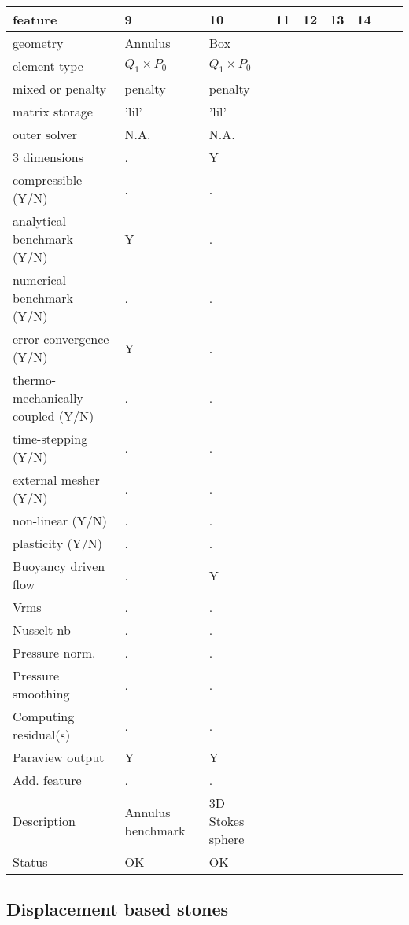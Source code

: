 \begin{landscape}
\noindent
{\tiny
\begin{tabular}{|l|p{2cm}|p{2cm}|p{2cm}|p{2cm}|p{2cm}|p{2cm}|p{2cm}|p{2cm}|} 
\hline
feature & 9 & 10 & 11 & 12 & 13 & 14 & \\ 
\hline
geometry & Annulus  & Box\\ 
element type & $Q_1\times P_0$ & $Q_1\times P_0$ & \\ 
mixed or penalty  & penalty & penalty & \\ 
matrix storage & 'lil' & 'lil' \\ 
outer solver & N.A. & N.A. \\ 
\hline
3 dimensions & . & Y & \\ 
compressible (Y/N)  & . & . &\\
analytical benchmark (Y/N) & Y & . &  \\ 
numerical benchmark (Y/N) & . & . & \\ 
error convergence (Y/N) & Y & . & \\
thermo-mechanically coupled (Y/N) & . & . &\\
time-stepping (Y/N) & . & . &\\
external mesher (Y/N) & .& . & \\
non-linear (Y/N) & .& . &\\
plasticity (Y/N) & . & .& \\ 
Buoyancy driven flow & .& Y & \\ 
Vrms  & . & . & \\ 
Nusselt nb  & . & .&\\ 
Pressure norm. & . & .&\\
Pressure smoothing & . & . &  \\ 
Computing residual(s) & .& . &\\
Paraview output & Y & Y & \\
\hline
Add. feature &. &. & & & & & & \\
\hline
Description & Annulus benchmark & 3D Stokes sphere\\
\hline
Status & OK & OK & \\ 
\hline
\end{tabular}
}









\subsection{Displacement based stones}


\end{landscape}
